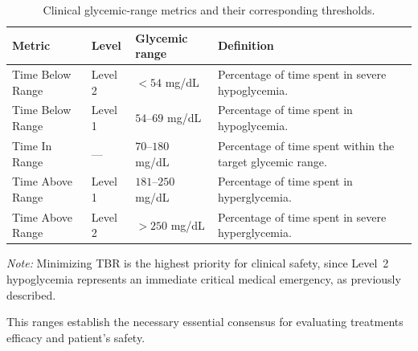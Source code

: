 \begin{table}[htbp]
    \centering
    \caption{Clinical glycemic-range metrics and their corresponding thresholds.}
    \label{tab:glycemic_range_metrics}
    
    \begin{tabularx}{\textwidth}{
        >{\raggedright\arraybackslash}p{2.4cm}
        >{\raggedright\arraybackslash}p{1.5cm}
        >{\centering\arraybackslash}p{2.3cm}
        >{\raggedright\arraybackslash}X
    }
        \hline
        \textbf{Metric} &
        \textbf{Level} &
        \textbf{Glycemic range} &
        \textbf{Definition} \\
        \hline
        
        Time Below Range &
        Level 2 &
        $<54$ mg/dL &
        Percentage of time spent in severe hypoglycemia. \\
        
        Time Below Range &
        Level 1 &
        $54$--$69$ mg/dL &
        Percentage of time spent in hypoglycemia. \\
        
        Time In Range &
        --- &
        $70$--$180$ mg/dL &
        Percentage of time spent within the target glycemic range. \\
        
        Time Above Range &
        Level 1 &
        $181$--$250$ mg/dL &
        Percentage of time spent in hyperglycemia. \\
        
        Time Above Range &
        Level 2 &
        $>250$ mg/dL &
        Percentage of time spent in severe hyperglycemia. \\
        
        \hline
    \end{tabularx}
    
    \vspace{0.2cm}
    
    \begin{minipage}{\textwidth}
        \footnotesize
        \textit{Note:} Minimizing TBR is the highest priority for clinical
        safety, since Level~2 hypoglycemia represents an immediate critical
        medical emergency, as previously described.
    \end{minipage}
\end{table}

This ranges establish the necessary essential consensus for evaluating treatments efficacy and patient's safety.

